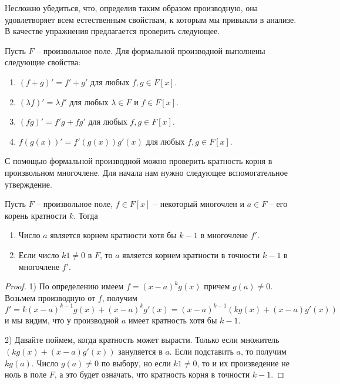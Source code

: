 Несложно убедиться, что, определив таким образом производную, она удовлетворяет всем естественным свойствам, к которым мы привыкли в анализе.
В качестве упражнения предлагается проверить следующее.

\begin{claim}
Пусть $F$ -- произвольное поле.
Для формальной производной выполнены следующие свойства:
\begin{enumerate}
\item $(f + g)' = f' + g'$ для любых $f,g\in F[x]$.

\item $(\lambda f )' = \lambda f'$ для любых $\lambda\in F$ и $f\in F[x]$.

\item $(fg)' = f' g + fg'$ для любых $f,g\in F[x]$.

\item $f(g(x))' = f'(g(x)) g'(x)$ для любых $f,g\in F[x]$.
\end{enumerate}
\end{claim}


С помощью формальной производной можно проверить кратность корня в произвольном многочлене.
Для начала нам нужно следующее вспомогательное утверждение.

\begin{claim}
Пусть $F$ -- произвольное поле, $f\in F[x]$ -- некоторый многочлен и $a\in F$ -- его корень кратности $k$.
Тогда 
\begin{enumerate}
\item Число $a$ является корнем кратности хотя бы $k-1$ в многочлене $f'$.

\item Если число $k 1 \neq 0$ в $F$, то $a$ является корнем кратности в точности $k - 1$ в многочлене $f'$.
\end{enumerate}
\end{claim}
\begin{proof}
1) По определению имеем $f = (x - a)^k g(x)$ причем $g(a) \neq 0$.
Возьмем производную от $f$, получим
\[
f' = k(x-a)^{k-1}g(x) + (x-a)^k g'(x) = (x-a)^{k-1}(kg(x) + (x-a)g'(x))
\]
и мы видим, что у производной $a$ имеет кратность хотя бы $k-1$.

2) Давайте поймем, когда кратность может вырасти.
Только если множитель $(kg(x) + (x-a)g'(x))$ зануляется в $a$.
Если подставить $a$, то получим $kg(a)$.
Число $g(a)\neq 0$ по выбору, но если $k 1\neq 0$, то и их произведение не ноль в поле $F$, а это будет означать, что кратность корня в точности $k - 1$.
\end{proof}

